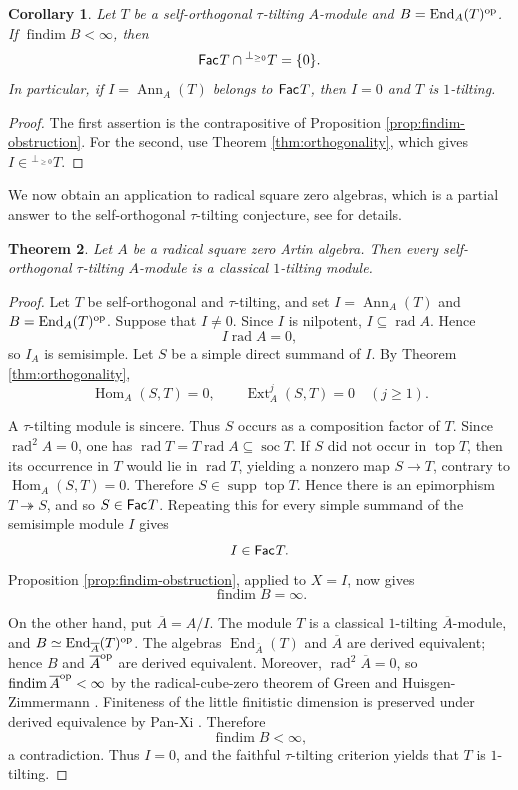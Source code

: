 \documentclass[a4paper,reqno]{amsart}
\newtheorem{theorem}{Theorem}[section]
\newtheorem{corollary}[theorem]{Corollary}
\theoremstyle{definition}
\newcommand{\Ext}{\operatorname{Ext}\nolimits}
\newcommand{\Hom}{\operatorname{Hom}\nolimits}
\newcommand{\End}{\operatorname{End}\nolimits}
\newcommand{\Ann}{\operatorname{Ann}\nolimits}
\newcommand{\rad}{\operatorname{rad}\nolimits}
\newcommand{\soc}{\operatorname{soc}\nolimits}
\newcommand{\topm}{\operatorname{top}\nolimits}
\newcommand{\supp}{\operatorname{supp}\nolimits}
\newcommand{\Fac}{\mathsf{Fac}\hspace{.01in}}
\newcommand{\findim}{\operatorname{findim}\nolimits}
\numberwithin{equation}{section}
\begin{document}
\begin{corollary}
\label{cor:finite-findim-detection}
Let $T$ be a self-orthogonal $\tau$-tilting $A$-module and
$B=\End_A(T)^{\rm op}$. If $\findim B<\infty$, then
\[
 \Fac T\cap{}^{\perp_{\geq0}}T=\{0\}.
\]
In particular, if $I=\Ann_A(T)$ belongs to $\Fac T$, then $I=0$ and
$T$ is $1$-tilting.
\end{corollary}

\begin{proof}
The first assertion is the contrapositive of Proposition
\ref{prop:findim-obstruction}. For the second, use Theorem
\ref{thm:orthogonality}, which gives $I\in{}^{\perp_{\geq0}}T$.
\end{proof}

We now obtain an application to radical square zero algebras, which is a partial answer to the self-orthogonal $\tau$-tilting conjecture, see \cite{CLZZ,Zhang} for details.

\begin{theorem}
\label{thm:radical-square-zero}
Let $A$ be a radical square zero Artin algebra.
Then every self-orthogonal $\tau$-tilting $A$-module is a classical
$1$-tilting module.
\end{theorem}

\begin{proof}
Let $T$ be self-orthogonal and $\tau$-tilting, and set
$I=\Ann_A(T)$ and $B=\End_A(T)^{\rm op}$. Suppose that $I\neq0$.
Since $I$ is
nilpotent, $I\subseteq\rad A$.  Hence
\[
                         I\rad A=0,
\]
so $I_A$ is semisimple. Let $S$ be a simple direct summand of $I$.
By Theorem \ref{thm:orthogonality},
\[
       \Hom_A(S,T)=0,
       \qquad
       \Ext_A^j(S,T)=0\quad(j\geq1).
\]

A $\tau$-tilting module is sincere. Thus $S$ occurs as a composition
factor of $T$. Since $\rad^2 A=0$, one has
$\rad T=T\rad A\subseteq\soc T$. If $S$ did not occur in $\topm T$,
then its occurrence in $T$ would lie in $\rad T$, yielding a nonzero
map $S\to T$, contrary to $\Hom_A(S,T)=0$. Therefore
$S\in\supp\topm T$. Hence there is an epimorphism
$T\twoheadrightarrow S$, and so $S\in\Fac T$. Repeating this for
every simple summand of the semisimple module $I$ gives
\[
                              I\in\Fac T.
\]
Proposition \ref{prop:findim-obstruction}, applied to $X=I$, now gives
\[
                      \findim B=\infty.
\]

On the other hand, put $\overline A=A/I$. The module $T$ is a
classical $1$-tilting $\overline A$-module, and
$B\simeq\End_{\overline A}(T)^{\rm op}$. The algebras
$\End_{\overline A}(T)$ and $\overline A$ are derived equivalent;
hence $B$ and $\overline A^{\rm op}$ are derived equivalent.
Moreover, $\rad^2\overline A=0$, so
$\findim\overline A^{\rm op}<\infty$ by the radical-cube-zero theorem
of Green and Huisgen-Zimmermann \cite[Theorem 16]{GreenHuisgen}. Finiteness of the
little finitistic dimension is preserved under derived equivalence
by Pan-Xi \cite[Theorem 1.1]{PanXi}. Therefore
\[
                     \findim B<\infty,
\]
a contradiction. Thus $I=0$, and the faithful $\tau$-tilting
criterion yields that $T$ is $1$-tilting.
\end{proof}
\end{document}
